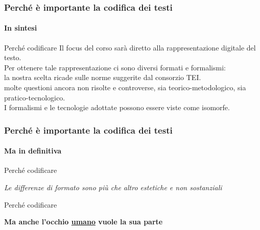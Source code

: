 \begin{frame}
    \frametitle{Perché è importante la codifica dei testi}
    \framesubtitle{In sintesi}
    \addtocounter{nframe}{1}
    
    \begin{block}{Perché codificare}
    Il focus del corso sarà diretto alla rappresentazione digitale del testo.
    \\ Per ottenere tale rappresentazione ci sono diversi formati e formalismi:
    \\ la nostra scelta ricade sulle norme suggerite dal consorzio TEI.
    \\ molte questioni ancora non risolte e controverse, sia teorico-metodologico, sia pratico-tecnologico.
    \\ I formalismi e le tecnologie adottate possono essere viste come isomorfe.
    \end{block}

\end{frame}

\begin{frame}
    \frametitle{Perché è importante la codifica dei testi}
    \framesubtitle{Ma in definitiva}
    \addtocounter{nframe}{1}
    
    \begin{block}{Perché codificare}

        \begin{center}
            \textit{Le differenze di formato sono più che altro estetiche e non sostanziali}
        \end{center}

    \end{block}
     

    \begin{block}{Perché codificare}

        \begin{center}
            \textbf{Ma anche l'occhio \underline{umano} vuole la sua parte}
        \end{center}
       

    \end{block}

\end{frame}


